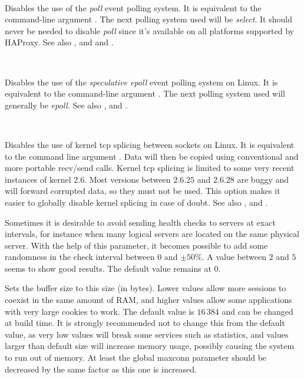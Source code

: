 \begin{keywords}
 \ 

  Disables the use of the \emph{poll} event polling system. It is equivalent to the
  command-line argument . The next polling system used will be \emph{select}.
  It should never be needed to disable \emph{poll} since it's available on all
  platforms supported by HAProxy. See also , and  and
  .

 \ 

  Disables the use of the \emph{speculative epoll} event polling system on Linux. It
  is equivalent to the command-line argument . The next polling system
  used will generally be \emph{epoll}. See also , and .

 \ 

  Disables the use of kernel tcp splicing between sockets on Linux. It is
  equivalent to the command line argument .  Data will then be copied
  using conventional and more portable recv/send calls. Kernel tcp splicing is
  limited to some very recent instances of kernel $2.6$. Most versions between
  $2.6.25$ and $2.6.28$ are buggy and will forward corrupted data, so they must not
  be used. This option makes it easier to globally disable kernel splicing in
  case of doubt. See also ,  and
  .

 

  Sometimes it is desirable to avoid sending health checks to servers at exact
  intervals, for instance when many logical servers are located on the same
  physical server. With the help of this parameter, it becomes possible to add
  some randomness in the check interval between $0$ and $\pm 50 \%$. A value between
  $2$ and $5$ seems to show good results. The default value remains at $0$.

 

  Sets the buffer size to this size (in bytes). Lower values allow more
  sessions to coexist in the same amount of RAM, and higher values allow some
  applications with very large cookies to work. The default value is $16\,384$
  and can be changed at build time. It is strongly recommended not to change this
  from the default value, as very low values will break some services such as
  statistics, and values larger than default size will increase memory usage,
  possibly causing the system to run out of memory. At least the global maxconn
  parameter should be decreased by the same factor as this one is increased.


\end{keywords}
